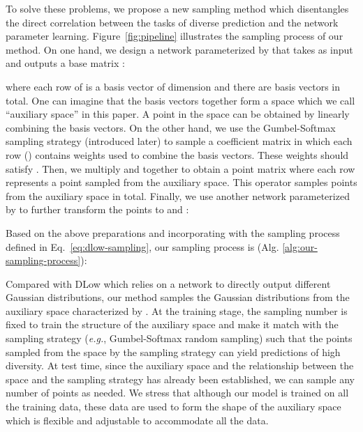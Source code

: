 \documentclass[sigconf,screen,nonacm]{acmart}
\begin{document}
	To solve these problems, we propose a new sampling method which disentangles the direct correlation between the tasks of diverse prediction and the network parameter learning. Figure~\ref{fig:pipeline} illustrates the sampling process of our method. On one hand, we design a network  parameterized by  that takes  as input and outputs a base matrix :
	
	where each row of  is a basis vector of dimension  and there are  basis vectors in total. One can imagine that the basis vectors together form a space which we call ``auxiliary space'' in this paper. A point in the space can be obtained by linearly combining the basis vectors. On the other hand, we use the Gumbel-Softmax sampling strategy (introduced later) to sample a coefficient matrix  in which each row  () contains  weights used to combine the basis vectors. These weights should satisfy . Then, we multiply  and  together to obtain a point matrix  where each row represents a point sampled from the auxiliary space. This operator samples  points from the auxiliary space in total. Finally, we use another network  parameterized by  to further transform the  points to  and :
	
	
	Based on the above preparations and incorporating with the sampling process defined in Eq.~\ref{eq:dlow-sampling}, our sampling process is (Alg. \ref{alg:our-sampling-process}):
	
	Compared with DLow which relies on a network to directly output different Gaussian distributions, our method samples the Gaussian distributions from the auxiliary space characterized by . At the training stage, the sampling number  is fixed to train the structure of the auxiliary space and make it match with the sampling strategy (\textit{e.g.}, Gumbel-Softmax random sampling) such that the points sampled from the space by the sampling strategy can yield predictions of high diversity. At test time, since the auxiliary space and the relationship between the space and the sampling strategy has already been established, we can sample any number of points as needed. We stress that although our model is trained on all the training data, these data are used to form the shape of the auxiliary space which is flexible and adjustable to accommodate all the data.
	
\end{document}
